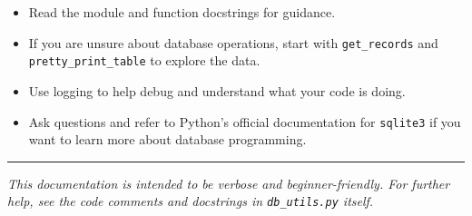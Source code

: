 \begin{itemize}
\tightlist
\item
  Read the module and function docstrings for guidance.
\item
  If you are unsure about database operations, start with
  \texttt{get\_records} and \texttt{pretty\_print\_table} to explore the
  data.
\item
  Use logging to help debug and understand what your code is doing.
\item
  Ask questions and refer to Python's official documentation for
  \texttt{sqlite3} if you want to learn more about database programming.
\end{itemize}

\begin{center}\rule{0.5\linewidth}{0.5pt}\end{center}

\emph{This documentation is intended to be verbose and
beginner-friendly. For further help, see the code comments and
docstrings in \texttt{db\_utils.py} itself.}
